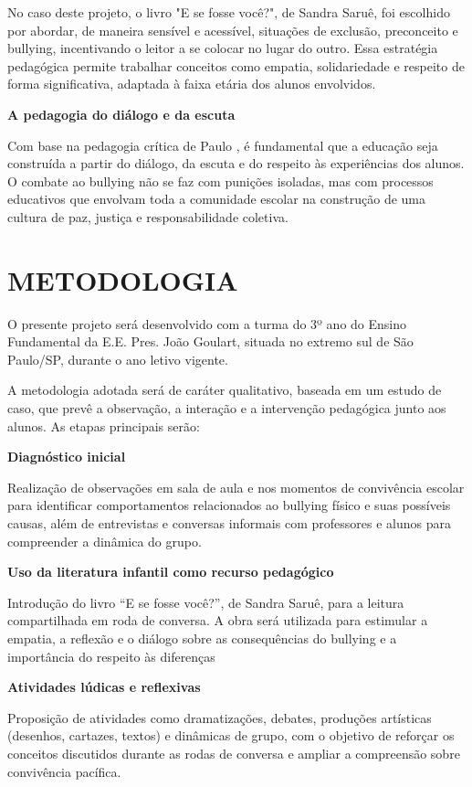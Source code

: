 No caso deste projeto, o livro "E se fosse você?", de Sandra Saruê, foi escolhido por abordar, de maneira sensível e acessível, situações de exclusão, preconceito e bullying, incentivando o leitor a se colocar no lugar do outro. Essa estratégia pedagógica permite trabalhar conceitos como empatia, solidariedade e respeito de forma significativa, adaptada à faixa etária dos alunos envolvidos. 

\textbf{A pedagogia do diálogo e da escuta}

Com base na pedagogia crítica de Paulo , é fundamental que a educação seja construída a partir do diálogo, da escuta e do respeito às experiências dos alunos. O combate ao bullying não se faz com punições isoladas, mas com processos educativos que envolvam toda a comunidade escolar na construção de uma cultura de paz, justiça e responsabilidade coletiva.

\section{METODOLOGIA}

O presente projeto será desenvolvido com a turma do 3º ano do Ensino Fundamental da E.E. Pres. João Goulart, situada no extremo sul de São Paulo/SP, durante o ano letivo vigente.

A metodologia adotada será de caráter qualitativo, baseada em um estudo de caso, que prevê a observação, a interação e a intervenção pedagógica junto aos alunos. As etapas principais serão:

\textbf{Diagnóstico inicial}

Realização de observações em sala de aula e nos momentos de convivência escolar para identificar comportamentos relacionados ao bullying físico e suas possíveis causas, além de entrevistas e conversas informais com professores e alunos para compreender a dinâmica do grupo.

\textbf{Uso da literatura infantil como recurso pedagógico}

Introdução do livro “E se fosse você?”, de Sandra Saruê, para a leitura compartilhada em roda de conversa. A obra será utilizada para estimular a empatia, a reflexão e o diálogo sobre as consequências do bullying e a importância do respeito às diferenças


\textbf{Atividades lúdicas e reflexivas}

Proposição de atividades como dramatizações, debates, produções artísticas (desenhos, cartazes, textos) e dinâmicas de grupo, com o objetivo de reforçar os conceitos discutidos durante as rodas de conversa e ampliar a compreensão sobre convivência pacífica.

